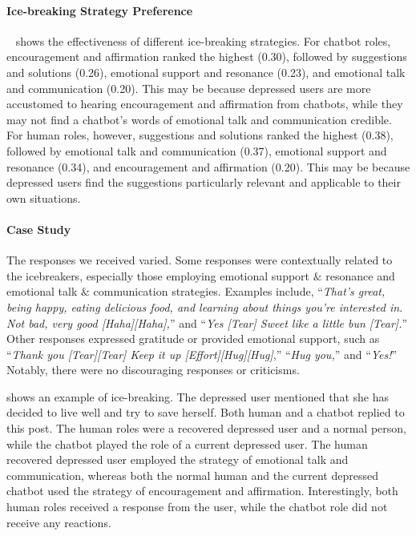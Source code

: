 \paragraph{Ice-breaking Strategy Preference}
~ shows the effectiveness of different ice-breaking strategies. For chatbot roles, encouragement and affirmation ranked the highest (0.30), followed by suggestions and solutions (0.26), emotional support and resonance (0.23), and emotional talk and communication (0.20). This may be because depressed users are more accustomed to hearing encouragement and affirmation from chatbots, while they may not find a chatbot's words of emotional talk and communication credible. For human roles, however, suggestions and solutions ranked the highest (0.38), followed by emotional talk and communication (0.37), emotional support and resonance (0.34), and encouragement and affirmation (0.20). This may be because depressed users find the suggestions particularly relevant and applicable to their own situations.

\paragraph{Case Study}

The responses we received varied. Some responses were contextually related to the icebreakers, especially those employing emotional support \( \mbox{\&} \) resonance and emotional talk \( \mbox{\&} \) communication strategies. Examples include, ``\textit{That's great, being happy, eating delicious food, and learning about things you're interested in. Not bad, very good [Haha][Haha],}'' and ``\textit{Yes [Tear] Sweet like a little bun [Tear].}'' Other responses expressed gratitude or provided emotional support, such as ``\textit{Thank you [Tear][Tear] Keep it up [Effort][Hug][Hug]},'' ``\textit{Hug you,}'' and ``\textit{Yes!}'' Notably, there were no discouraging responses or criticisms.

 shows an example of ice-breaking. The depressed user mentioned that she has decided to live well and try to save herself. Both human and a chatbot replied to this post. The human roles were a recovered depressed user and a normal person, while the chatbot played the role of a current depressed user. The human recovered depressed user employed the strategy of emotional talk and communication, whereas both the normal human and the current depressed chatbot used the strategy of encouragement and affirmation. Interestingly, both human roles received a response from the user, while the chatbot role did not receive any reactions.

